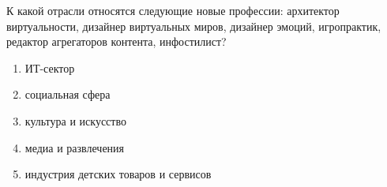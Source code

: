 
К какой отрасли относятся следующие новые профессии: архитектор виртуальности, дизайнер виртуальных миров, дизайнер эмоций, игропрактик, редактор агрегаторов контента, инфостилист?

\begin{enumerate}
    \item ИТ-сектор
    \item социальная сфера
    \item культура и искусство
    \item медиа и развлечения
    \item индустрия детских товаров и сервисов
\end{enumerate}

